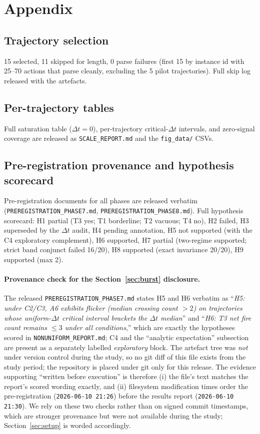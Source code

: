\section{Appendix}

\subsection{Trajectory selection}
15 selected, 11 skipped for length, 0 parse failures (first 15 by instance id
with 25--70 actions that parse cleanly, excluding the 5 pilot trajectories).
Full skip log released with the artefacts.

\subsection{Per-trajectory tables}
Full saturation table ($\Delta t = 0$), per-trajectory critical-$\Delta t$
intervals, and zero-signal coverage are released as
\texttt{SCALE\_REPORT.md} and the \texttt{fig\_data/} CSVs.

\subsection{Pre-registration provenance and hypothesis scorecard}
\label{app:prereg}
Pre-registration documents for all phases are released verbatim
(\texttt{PREREGISTRATION\_\allowbreak PHASE7.md}, \texttt{PREREGISTRATION\_\allowbreak PHASE8.md}).
Full hypothesis scorecard: H1 partial (T3 yes; T1 borderline; T2 vacuous; T4
no), H2 failed, H3 superseded by the $\Delta t$ audit, H4 pending annotation, H5
not supported (with the C4 exploratory complement), H6 supported, H7 partial
(two-regime supported; strict band conjunct failed 16/20), H8 supported (exact
invariance 20/20), H9 supported (max 2).

\paragraph{Provenance check for the Section~\ref{sec:burst} disclosure.} The released
\texttt{PREREGISTRATION\_PHASE7.md} states H5 and H6 verbatim as ``\emph{H5:
under C2/C3, A6 exhibits flicker (median crossing count $>2$) on trajectories
whose uniform-$\Delta t$ critical interval brackets the $\Delta t$ median}'' and
``\emph{H6: T3 net fire count remains $\le 3$ under all conditions},'' which are
exactly the hypotheses scored in \texttt{NONUNIFORM\_REPORT.md}; C4 and the
``analytic expectation'' subsection are present as a separately labelled
\emph{exploratory} block. The artefact tree was \emph{not} under version control
during the study, so no git diff of this file exists from the study period; the
repository is placed under git only for this release. The evidence supporting
``written before execution'' is therefore (i) the file's text matches the
report's scored wording exactly, and (ii) filesystem modification times order
the pre-registration (\texttt{2026-06-10 21:26}) before the results report
(\texttt{2026-06-10 21:30}). We rely on these two checks rather than on signed
commit timestamps, which are stronger provenance but were not available during
the study; Section~\ref{sec:setup} is worded accordingly.

